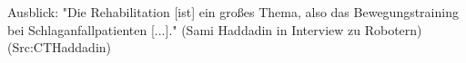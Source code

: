 Ausblick: "Die Rehabilitation [ist] ein großes Thema, also das Bewegungstraining bei Schlaganfallpatienten [...]." (Sami Haddadin in Interview zu Robotern) (Src:CTHaddadin)